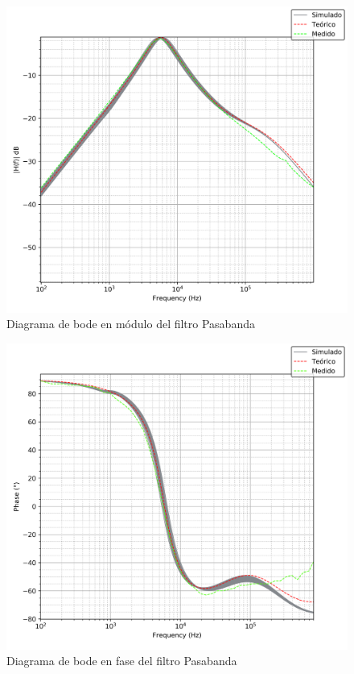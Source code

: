 \begin{figure}[H]
    \centering
        \includegraphics[scale=0.5]{../EJ2/Recursos/bode_pasabanda_modulo.png}
    \caption{Diagrama de bode en m\'odulo del filtro Pasabanda}
    \label{fig:bode_pasabanda_modulo}
\end{figure}

\begin{figure}[H]
    \centering
        \includegraphics[scale=0.5]{../EJ2/Recursos/bode_pasabanda_fase.png}
    \caption{Diagrama de bode en fase del filtro Pasabanda}
    \label{fig:bode_pasabanda_fase}
\end{figure}

